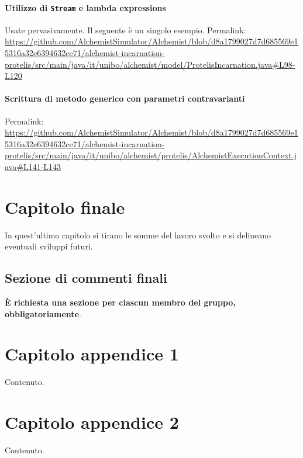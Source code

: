 \documentclass[a4paper,12pt]{report}
\begin{document}
\subsubsection{Utilizzo di \texttt{Stream} e lambda expressions}

Usate pervasivamente. Il seguente è un singolo esempio.
Permalink: \url{https://github.com/AlchemistSimulator/Alchemist/blob/d8a1799027d7d685569e15316a32e6394632ce71/alchemist-incarnation-protelis/src/main/java/it/unibo/alchemist/model/ProtelisIncarnation.java#L98-L120}

\subsubsection{Scrittura di metodo generico con parametri contravarianti}

Permalink: \url{https://github.com/AlchemistSimulator/Alchemist/blob/d8a1799027d7d685569e15316a32e6394632ce71/alchemist-incarnation-protelis/src/main/java/it/unibo/alchemist/protelis/AlchemistExecutionContext.java#L141-L143}

\chapter{Capitolo finale}

In quest'ultimo capitolo si tirano le somme del lavoro svolto e si delineano eventuali sviluppi
futuri.

\section{Sezione di commenti finali}

\textbf{È richiesta una sezione per ciascun membro del gruppo, obbligatoriamente}.

\appendix
\chapter{Capitolo appendice 1}

Contenuto.

\chapter{Capitolo appendice 2}

Contenuto.



\end{document}
